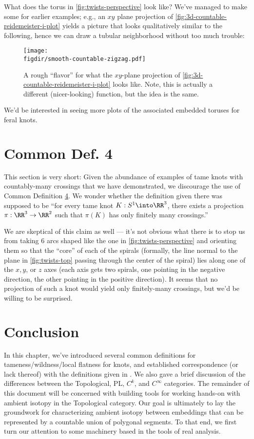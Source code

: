 \begin{question}
  What does the torus in \cref{fig:twists-perspective} look like?
  We've managed to make some for earlier examples; e.g., an $xy$ plane
  projection of \cref{fig:3d-countable-reidemeister-i-plot} yields a
  picture that looks qualitatively similar to the following, hence we
  can draw a tubular neighborhood without too much trouble:
  \begin{figure}[H]
    \centering
    \texttt{[image: \\figdir/smooth-countable-zigzag.pdf]}
    \caption{A rough ``flavor'' for what the $xy$-plane projection of
      \cref{fig:3d-countable-reidemeister-i-plot} looks like. Note,
      this is actually a different (nicer-looking) function, but the
      idea is the same.}
  \end{figure}
  We'd be interested in seeing more plots of the associated embedded
  toruses for feral knots.
\end{question}


\section{Common Def. 4}
This section is very short: Given the abundance of examples of tame
knots with countably-many crossings that we have demonstrated, we
discourage the use of Common Definition \hyperlink{def:cdef4b}{4}. We
wonder whether the definition given there was supposed to be ``for
every tame knot $K : S^1 \into \RR^3$, there exists a projection $\pi
: \RR^3 \to \RR^2$ such that $\pi(K)$ has only finitely many
crossings.''

We are skeptical of this claim as well --- it's not obvious what there
is to stop us from taking 6 arcs shaped like the one in
\cref{fig:twists-perspective} and orienting them so that the ``core''
of each of the spirals (formally, the line normal to the plane in
\cref{fig:twists-top} passing through the center of the spiral) lies
along one of the $x,y$, or $z$ axes (each axis gets two spirals, one
pointing in the negative direction, the other pointing in the positive
direction). It seems that no projection of such a knot would yield
only finitely-many crossings, but we'd be willing to be surprised.

\section{Conclusion}
In this chapter, we've introduced several common definitions for
tameness/wildness/local flatness for knots, and established
correspondence (or lack thereof) with the definitions given in
\cite{Daverman}. We also gave a brief discussion of the differences
between the Topological, PL, $C^k$, and $C^\infty$ categories. The
remainder of this document will be concerned with building tools for
working hands-on with ambient isotopy in the Topological category. Our
goal is ultimately to lay the groundwork for characterizing ambient
isotopy between embeddings that can be represented by a countable
union of polygonal segments. To that end, we first turn our attention
to some machinery based in the tools of real analysis.





